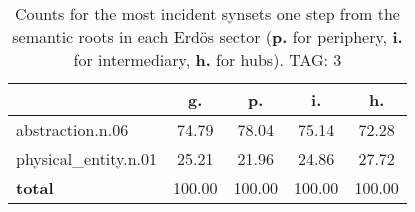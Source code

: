 \begin{table}[h!]
\begin{center}
\begin{tabular}{| l || c | c | c | c |}\hline
 & {\bf g.} & {\bf p.} & {\bf i.} & {\bf h.} \\\hline\hline
abstraction.n.06 & 74.79  & 78.04  & 75.14  & 72.28 \\\hline
physical\_entity.n.01 & 25.21  & 21.96  & 24.86  & 27.72 \\\hline\hline
{{\bf total}} & 100.00  & 100.00  & 100.00  & 100.00 \\\hline
\end{tabular}
\caption{Counts for the most incident synsets one step from the semantic roots in each Erd\"os sector ({\bf p.} for periphery, {\bf i.} for intermediary, {\bf h.} for hubs). TAG: 3}
\end{center}
\end{table}